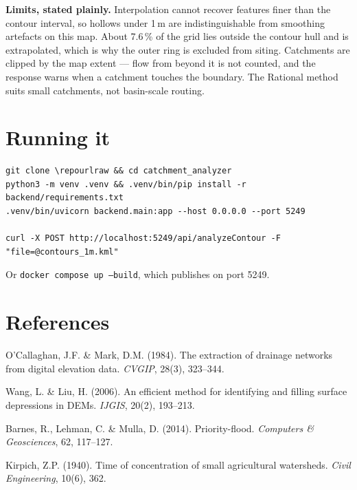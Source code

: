\documentclass[11pt,a4paper]{article}
\newcommand{\repourlraw}{https://github.com/devreddy1015/catchment_analyzer}
\newenvironment{codebox}{%
  \par\addvspace{5pt}%
  \def\FrameCommand{\fboxsep=7pt\colorbox{shadecolor}}%
  \MakeFramed{\FrameRestore}\noindent%
}{\par\endMakeFramed\addvspace{5pt}}
\begin{document}
\textbf{Limits, stated plainly.} Interpolation cannot recover features finer
than the contour interval, so hollows under 1\,m are indistinguishable from
smoothing artefacts on this map. About 7.6\,\% of the grid lies outside the
contour hull and is extrapolated, which is why the outer ring is excluded from
siting. Catchments are clipped by the map extent --- flow from beyond it is not
counted, and the response warns when a catchment touches the boundary. The
Rational method suits small catchments, not basin-scale routing.

\section{Running it}

\begin{codebox}
\begin{lstlisting}[style=plainstyle]
git clone \repourlraw && cd catchment_analyzer
python3 -m venv .venv && .venv/bin/pip install -r backend/requirements.txt
.venv/bin/uvicorn backend.main:app --host 0.0.0.0 --port 5249

curl -X POST http://localhost:5249/api/analyzeContour -F "file=@contours_1m.kml"
\end{lstlisting}
\end{codebox}

\noindent Or \texttt{docker compose up --build}, which publishes on port 5249.

\section*{References}

\begin{enumerate}[label={[\arabic*]}]
\item O'Callaghan, J.F. \& Mark, D.M. (1984). The extraction of drainage
networks from digital elevation data. \emph{CVGIP}, 28(3), 323--344.
\item Wang, L. \& Liu, H. (2006). An efficient method for identifying and
filling surface depressions in DEMs. \emph{IJGIS}, 20(2), 193--213.
\item Barnes, R., Lehman, C. \& Mulla, D. (2014). Priority-flood.
\emph{Computers \& Geosciences}, 62, 117--127.
\item Kirpich, Z.P. (1940). Time of concentration of small agricultural
watersheds. \emph{Civil Engineering}, 10(6), 362.
\end{enumerate}
\end{document}
